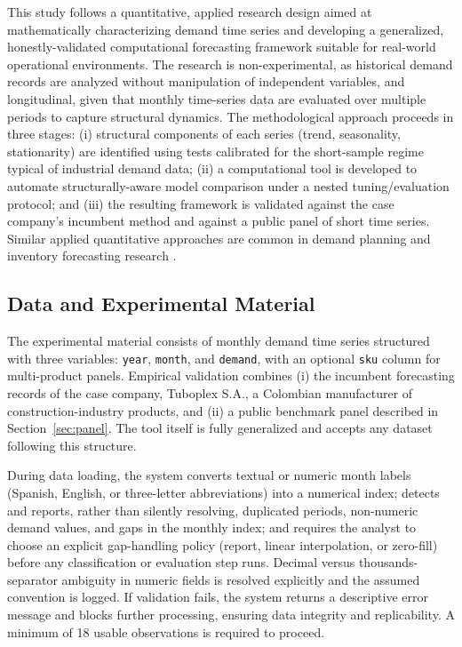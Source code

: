 \documentclass[forecasting,article,submit,pdftex,moreauthors]{Definitions/mdpi}
\begin{document}
This study follows a quantitative, applied research design aimed at mathematically characterizing demand time series and developing a generalized, honestly-validated computational forecasting framework suitable for real-world operational environments. The research is non-experimental, as historical demand records are analyzed without manipulation of independent variables, and longitudinal, given that monthly time-series data are evaluated over multiple periods to capture structural dynamics. The methodological approach proceeds in three stages: (i) structural components of each series (trend, seasonality, stationarity) are identified using tests calibrated for the short-sample regime typical of industrial demand data; (ii) a computational tool is developed to automate structurally-aware model comparison under a nested tuning/evaluation protocol; and (iii) the resulting framework is validated against the case company's incumbent method and against a public panel of short time series. Similar applied quantitative approaches are common in demand planning and inventory forecasting research \cite{petropoulos2022}.

\subsection{Data and Experimental Material}
\label{sec:data}

The experimental material consists of monthly demand time series structured with three variables: \texttt{year}, \texttt{month}, and \texttt{demand}, with an optional \texttt{sku} column for multi-product panels. Empirical validation combines (i) the incumbent forecasting records of the case company, Tuboplex S.A., a Colombian manufacturer of construction-industry products, and (ii) a public benchmark panel described in Section~\ref{sec:panel}. The tool itself is fully generalized and accepts any dataset following this structure.

During data loading, the system converts textual or numeric month labels (Spanish, English, or three-letter abbreviations) into a numerical index; detects and reports, rather than silently resolving, duplicated periods, non-numeric demand values, and gaps in the monthly index; and requires the analyst to choose an explicit gap-handling policy (report, linear interpolation, or zero-fill) before any classification or evaluation step runs. Decimal versus thousands-separator ambiguity in numeric fields is resolved explicitly and the assumed convention is logged. If validation fails, the system returns a descriptive error message and blocks further processing, ensuring data integrity and replicability. A minimum of 18 usable observations is required to proceed.
\end{document}
